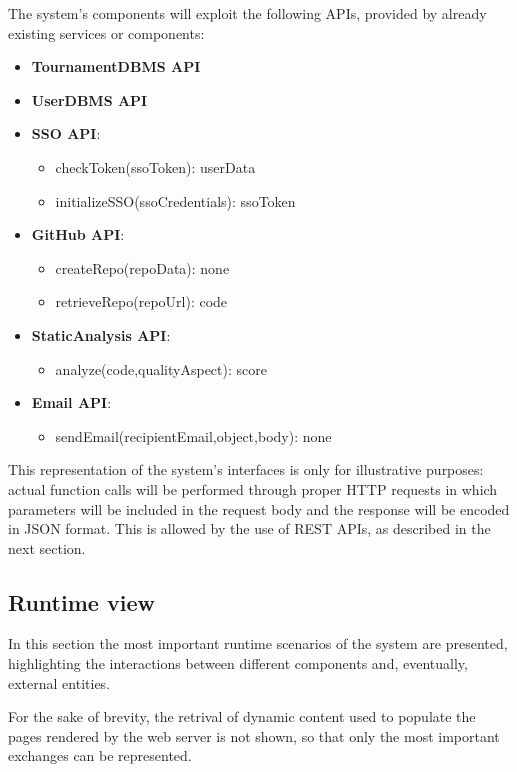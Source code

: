 The system's components will exploit the following APIs, provided by already existing services or components:
\begin{itemize}
    \item \textbf{TournamentDBMS API}
    \item \textbf{UserDBMS API}
    \item \textbf{SSO API}:
    \begin{itemize}
        \item checkToken(ssoToken): userData
        \item initializeSSO(ssoCredentials): ssoToken
    \end{itemize}
    \item \textbf{GitHub API}: 
    \begin{itemize}
        \item createRepo(repoData): none
        \item retrieveRepo(repoUrl): code
    \end{itemize}
    \item \textbf{StaticAnalysis API}: 
    \begin{itemize}
        \item analyze(code,qualityAspect): score
    \end{itemize}
    \item \textbf{Email API}:
    \begin{itemize}
        \item sendEmail(recipientEmail,object,body): none
    \end{itemize}
\end{itemize}
This representation of the system's interfaces is only for illustrative purposes: actual function calls will be performed through proper HTTP requests in which parameters will be included in the request body and the response will be encoded in JSON format. This is allowed by the use of REST APIs, as described in the next section.

\newpage
\subsection{Runtime view}
In this section the most important runtime scenarios of the system are presented, highlighting the interactions between different components and, eventually, external entities.

For the sake of brevity, the retrival of dynamic content used to populate the pages rendered by the web server is not shown, so that only the most important exchanges can be represented.
